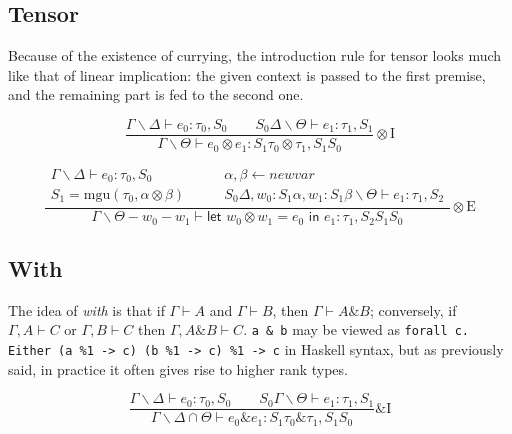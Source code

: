 \documentclass{article}
\newcommand{\mgu}[2]{\mathrm{mgu}(#1, #2)}
\newcommand{\newvar}{\mathit{newvar}}
\newcommand{\letin}[2]{\textsf{let } #1 \textsf{ in } #2}
\begin{document}
\subsection{Tensor}

Because of the existence of currying, the introduction rule for tensor looks much like that of linear implication: the given context is passed to the first premise, and the remaining part is fed to the second one.

\begin{displaymath}
  \frac
    {\Gamma \backslash \Delta \vdash e_0 : \tau_0, S_0 \qquad
     S_0 \Delta \backslash \Theta \vdash e_1 : \tau_1, S_1}
    {\Gamma \backslash \Theta \vdash e_0 \otimes e_1 : S_1 \tau_0 \otimes \tau_1, S_1 S_0}
  \otimes \mathrm{I}
\end{displaymath}

\begin{displaymath}
  \frac
    {\begin{array}{ll}
      \Gamma \backslash \Delta \vdash e_0 : \tau_0, S_0 \qquad &
      \alpha, \beta \leftarrow \newvar \\
      S_1 = \mgu{\tau_0}{\alpha \otimes \beta} \qquad &
      S_0 \Delta, w_0 : S_1 \alpha, w_1 : S_1 \beta \backslash \Theta \vdash e_1 : \tau_1, S_2
    \end{array}}
    {\Gamma \backslash \Theta - w_0 - w_1 \vdash \letin{w_0 \otimes w_1 = e_0}{e_1} : \tau_1, S_2 S_1 S_0}
  \otimes \mathrm{E}
\end{displaymath}

\subsection{With}

The idea of \textit{with} is that if $\Gamma \vdash A$ and $\Gamma \vdash B$, then $\Gamma \vdash A \& B$; conversely, if $\Gamma, A \vdash C$ or $\Gamma, B \vdash C$ then $\Gamma, A \& B \vdash C$. \lstinline{a & b} may be viewed as \lstinline{forall c. Either (a %1 -> c) (b %1 -> c) %1 -> c} in Haskell syntax, but as previously said, in practice it often gives rise to higher rank types.

\begin{displaymath}
  \frac
    {\Gamma \backslash \Delta \vdash e_0 : \tau_0, S_0 \qquad
     S_0 \Gamma \backslash \Theta \vdash e_1 : \tau_1, S_1}
    {\Gamma \backslash \Delta \cap \Theta \vdash e_0 \& e_1 : S_1 \tau_0 \& \tau_1, S_1 S_0}
  \&\mathrm{I}
\end{displaymath}
\end{document}
